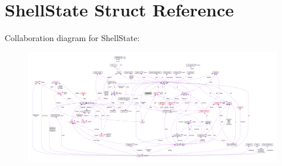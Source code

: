 \hypertarget{structShellState}{}\section{Shell\+State Struct Reference}
\label{structShellState}


Collaboration diagram for Shell\+State\+:\nopagebreak
\begin{figure}[H]
\begin{center}
\leavevmode
\includegraphics[width=350pt]{structShellState__coll__graph}
\end{center}
\end{figure}
